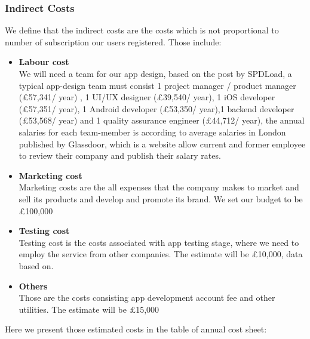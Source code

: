 \subsubsection{Indirect Costs}
We define that the indirect costs are the costs which is not proportional to number of subscription our users registered. Those include:
\begin{itemize}
\item \textbf{Labour cost}
\\We will need a team for our app design, based on the post by SPDLoad, a typical app-design team must consist 1 project manager / product manager (£57,341/ year) , 1 UI/UX designer (£39,540/ year), 1 iOS developer (£57,351/ year), 1 Android developer (£53,350/ year),1 backend developer (£53,568/ year) and 1 quality assurance engineer (£44,712/ year), the annual salaries for each team-member is according to average salaries in London published by Glassdoor, which is a website allow current and former employee to review their company and publish their salary rates.
\item \textbf{Marketing cost}
\\ Marketing costs are the all expenses that the company makes to market and sell its products and develop and promote its brand. We set our budget to be £100,000
\item \textbf{Testing cost}
\\ Testing cost is the costs associated with app testing stage, where we need to employ the service from other companies. The estimate will be £10,000, data based on.
\item \textbf{Others}
\\Those are the costs consisting app development account fee and other utilities. The estimate will be £15,000
\end{itemize}

Here we present those estimated costs in the table of annual cost sheet:


